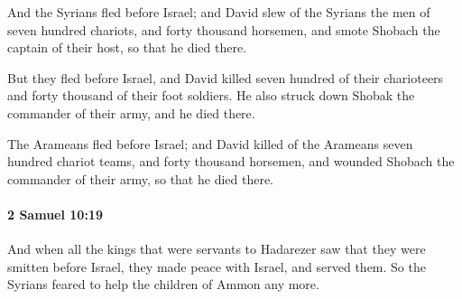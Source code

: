 			\begin{versebox}
					\item[BHS] 
					\item[ASV] And the Syrians fled before Israel; and David slew of the Syrians the men of seven hundred chariots, and forty thousand horsemen, and smote Shobach the captain of their host, so that he died there.
					\item[NIV] But they fled before Israel, and David killed seven hundred of their charioteers and forty thousand of their foot soldiers. He also struck down Shobak the commander of their army, and he died there.
					\item[NRSV] The Arameans fled before Israel; and David killed of the Arameans seven hundred chariot teams, and forty thousand horsemen, and wounded Shobach the commander of their army, so that he died there.
			\end{versebox}

		\paragraph{2 Samuel 10:19} %
			\label{2SAMUEL-10-19}

			And when all the kings that were servants to Hadarezer saw that they were smitten before Israel, they made peace with Israel, and served them. So the Syrians feared to help the children of Ammon any more.

